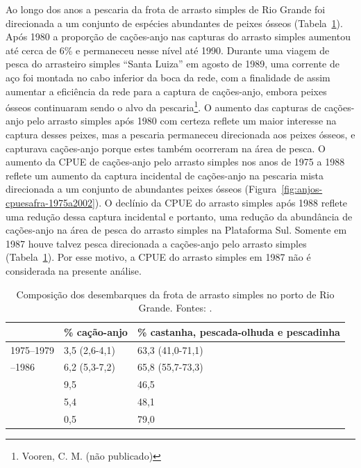 \documentclass[a4paper,11pt,twoside,showtrims,onecolumn,openright,final]{memoir}
\begin{document}
Ao longo dos anos a pescaria da frota de arrasto simples de Rio Grande foi direcionada 
a um conjunto de espécies abundantes de peixes ósseos (Tabela~\ref{tab:anjo-percentual-arrasto-simples}). %
Após 1980 a proporção de cações-anjo nas capturas do arrasto simples aumentou até cerca 
de 6\% e permaneceu nesse nível até 1990. Durante uma viagem de pesca do arrasteiro 
simples ``Santa Luiza'' em agosto de 1989, uma corrente de aço foi montada no cabo inferior 
da boca da rede, com a finalidade de assim aumentar a eficiência da rede para a captura 
de cações-anjo, embora peixes ósseos continuaram sendo o alvo da pescaria\footnote{Vooren, C. M. (não publicado)}. 
O aumento das capturas de cações-anjo pelo arrasto simples após 1980 com certeza reflete 
um maior interesse na captura desses peixes, mas a pescaria permaneceu direcionada aos peixes ósseos, 
e capturava cações-anjo porque estes também ocorreram na área de pesca. 
O aumento da CPUE de cações-anjo pelo arrasto simples nos anos de 1975 a 1988 reflete um 
aumento da captura incidental de cações-anjo na pescaria mista direcionada a um conjunto 
de abundantes peixes ósseos (Figura~\ref{fig:anjos-cpuesafra-1975a2002}).  %
O declínio da CPUE do arrasto simples após 1988 reflete uma redução dessa captura incidental 
e portanto, uma redução da abundância de cações-anjo na área de pesca do arrasto simples 
na Plataforma Sul. Somente em 1987 houve talvez pesca direcionada a cações-anjo 
pelo arrasto simples (Tabela~\ref{tab:anjo-percentual-arrasto-simples}).
Por esse motivo, a CPUE do arrasto simples em 1987 não é considerada 
na presente análise.


%
%

\begin{table}
\caption[Composição dos desembarques da frota de arrasto simples no porto de Rio Grande]
        {Composição dos desembarques da frota de arrasto simples no porto de Rio Grande. 
         Fontes: \citet{haimovici1997,miranda2003,ceperg2003}.} %
\label{tab:anjo-percentual-arrasto-simples}
\begin{tabularx}{\textwidth}{XXX}
\toprule
			& \% cação-anjo				& \% castanha, pescada-olhuda 
								   e pescadinha 		\\
\midrule
1975--1979		& 3,5 (2,6-4,1)				& 63,3 (41,0-71,1)		\\
\addlinespace
1980--1986		& 6,2 (5,3-7,2)				& 65,8 (55,7-73,3)		\\
\addlinespace
1987			& 9,5					& 46,5				\\
\addlinespace
1990			& 5,4					& 48,1				\\
\addlinespace
2001			& 0,5					& 79,0				\\
\bottomrule
\end{tabularx}
\end{table}
\end{document}
